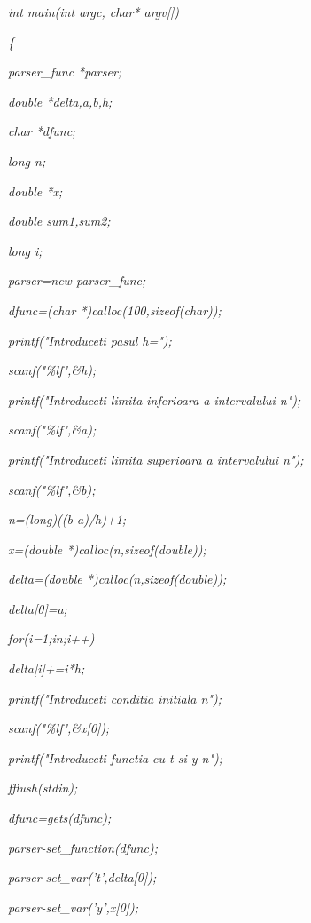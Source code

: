 \documentclass[a4paper,twoside]{book}
\begin{document}
\textit{int main(int argc, char* argv[])}

\textit{\{}

\textit{\qquad parser\_func *parser;}

\textit{\qquad double *delta,a,b,h;}

\textit{\qquad char *dfunc;}

\textit{\qquad long n;}

\textit{\qquad double *x;}

\textit{\qquad double sum1,sum2;}

\textit{\qquad long i;}

\textit{\qquad parser=new parser\_func;}

\textit{\qquad dfunc=(char *)calloc(100,sizeof(char));}

\textit{\qquad printf("Introduceti pasul h=");}

\textit{\qquad scanf("\%lf",\&h);}

\textit{\qquad printf("Introduceti limita inferioara a intervalului%
\TEXTsymbol{\backslash}n");}

\textit{\qquad scanf("\%lf",\&a);}

\textit{\qquad printf("Introduceti limita superioara a intervalului 
\TEXTsymbol{\backslash}n");}

\textit{\qquad scanf("\%lf",\&b);}

\textit{\qquad n=(long)((b-a)/h)+1;}

\textit{\qquad x=(double *)calloc(n,sizeof(double));}

\textit{\qquad delta=(double *)calloc(n,sizeof(double));}

\textit{\qquad delta[0]=a;}

\textit{\qquad for(i=1;i\TEXTsymbol{<}n;i++)}

\textit{\qquad \qquad delta[i]+=i*h;}

\textit{\qquad printf("Introduceti conditia initiala\TEXTsymbol{\backslash}%
n");}

\textit{\qquad scanf("\%lf",\&x[0]);}

\textit{\qquad printf("Introduceti functia cu t si y\TEXTsymbol{\backslash}%
n");}

\textit{\qquad fflush(stdin);}

\textit{\qquad dfunc=gets(dfunc);}

\textit{\qquad parser-\TEXTsymbol{>}set\_function(dfunc);}

\textit{\qquad parser-\TEXTsymbol{>}set\_var('t',delta[0]);}

\textit{\qquad parser-\TEXTsymbol{>}set\_var('y',x[0]);}
\end{document}
